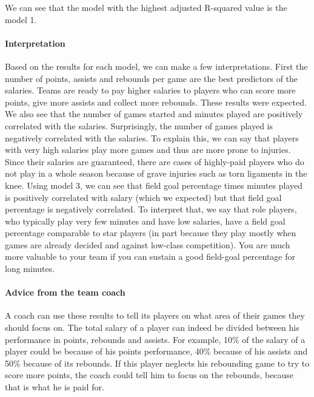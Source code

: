 We can see that the model with the highest adjusted R-squared value is the model 1.

\paragraph{Interpretation}Based on the results for each model, we can make a few interpretations. 
First the number of points, assists and rebounds per game are the best predictors of the salaries. Teams are ready to pay higher salaries to players who can score more points, give more assists and collect more rebounds. These results were expected.
We also see that the number of games started and minutes played are positively correlated with the salaries. Surprisingly, the number of games played is negatively correlated with the salaries. To explain this, we can say that players with very high salaries play more games and thus are more prone to injuries. Since their salaries are guaranteed, there are cases of highly-paid players who do not play in a whole season because of grave injuries such as torn ligaments in the knee.
Using model 3, we can see that field goal percentage times minutes played is positively correlated with salary (which we expected) but that field goal percentage is negatively correlated. To interpret that, we say that role players, who typically play very few minutes and have low salaries, have a field goal percentage comparable to star players (in part because they play mostly when games are already decided and against low-class competition). You are much more valuable to your team if you can sustain a good field-goal percentage for long minutes.

\paragraph{Advice from the team coach}A coach can use these results to tell its players on what area of their games they should focus on. The total salary of a player can indeed be divided between his performance in points, rebounds and assists.
For example, 10\% of the salary of a player could be because of his points performance, 40\% because of his assists and 50\% because of its rebounds. If this player neglects his rebounding game to try to score more points, the coach could tell him to focus on the rebounds, because that is what he is paid for.

